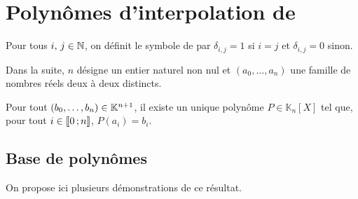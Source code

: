 \section{Polynômes d'interpolation de }

Pour tous $i,\, j \in \mathbb{N}$, on définit le symbole de  par $\delta_{i,j} = 1$ si $i = j$ et $\delta_{i,j} = 0$ sinon.

Dans la suite, $n$ désigne un entier naturel non nul et $(a_0, \ldots, a_n)$ une famille de nombres réels deux à deux distincts.

\begin{defi}
Pour tout $(b_0,\ldots,b_n) \in \mathbb{K}^{n+1}$, il existe un unique polynôme $P \in \mathbb{K}_n[X]$ tel que, pour tout $i \in \llbracket 0\,; n \rrbracket$, $P(a_i) = b_i$.
\end{defi}




\subsection{Base de polynômes}

On propose ici plusieurs démonstrations de ce résultat.


